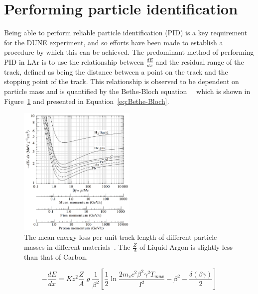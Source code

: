 \section{Performing particle identification}  \label{sec:PID} %
Being able to perform reliable particle identification (PID) is a key requirement for the DUNE experiment, and so efforts have been made to establish a procedure by which this can be achieved. The predominant method of performing PID in LAr is to use the relationship between $\frac{dE}{dx}$ and the residual range of the track, defined as being the distance between a point on the track and the stopping point of the track. This relationship is observed to be dependent on particle mass and is quantified by the Bethe-Bloch equation~\citep{Bethe}~\citep{Bloch} which is shown in Figure~\ref{fig:BetheBloch} and presented in Equation~\ref{eq:Bethe-Bloch}. \\

\begin{figure}[h!]
  \centering
  \includegraphics[width=0.5\textwidth]{Bethe-Bloch}
  \caption[The mean energy loss per unit track length of different particle masses in different materials]
          {The mean energy loss per unit track length of different particle masses in different materials~\citep{PDGReview}. The $\frac{Z}{A}$ of Liquid Argon is slightly less than that of Carbon.}
  \label{fig:BetheBloch}
\end{figure}

\begin{equation}
  \label{eq:Bethe-Bloch}
  -\frac{dE}{dx} = K z^2 \frac{Z}{A} \varrho \frac{1}{\beta^2} \left[ \frac{1}{2} \ln{\frac{2 m_e c^2 \beta^2 \gamma^2 T_{max}}{I^2}} - \beta^2 - \frac{\delta(\beta\gamma)}{2}\right]
\end{equation}


